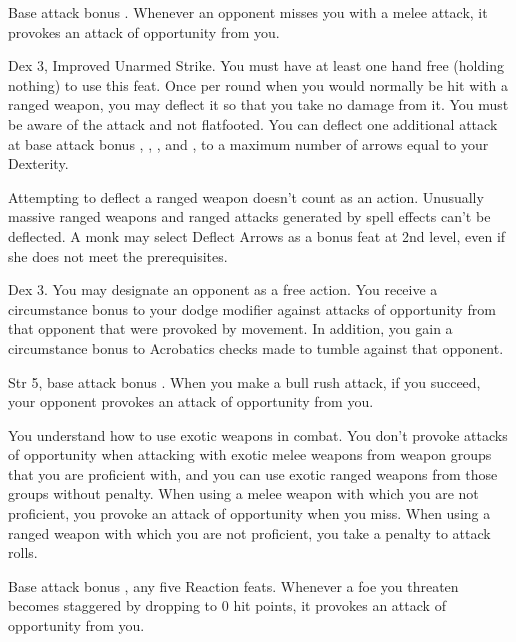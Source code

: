 \featpre Base attack bonus .
\featben Whenever an opponent misses you with a melee attack, it provokes an attack of opportunity from you.

 Dex 3, Improved Unarmed Strike.
 You must have at least one hand free (holding nothing) to use this feat. Once per round when you would normally be hit with a ranged weapon, you may deflect it so that you take no damage from it. You must be aware of the attack and not flatfooted. You can deflect one additional attack at base attack bonus , , , and , to a maximum number of arrows equal to your Dexterity.
\par Attempting to deflect a ranged weapon doesn't count as an action. Unusually massive ranged weapons and ranged attacks generated by spell effects can't be deflected.
 A monk may select Deflect Arrows as a bonus feat at 2nd level, even if she does not meet the prerequisites.

 Dex 3.
 You may designate an opponent as a free action. You receive a  circumstance bonus to your dodge modifier against attacks of opportunity from that opponent that were provoked by movement. In addition, you gain a  circumstance bonus to Acrobatics checks made to tumble against that opponent.

\featpre Str 5, base attack bonus .
\featben When you make a bull rush attack, if you succeed, your opponent provokes an attack of opportunity from you.

You understand how to use exotic weapons in combat.
 You don't provoke attacks of opportunity when attacking with exotic melee weapons from weapon groups that you are proficient with, and you can use exotic ranged weapons from those groups without penalty.
 When using a melee weapon with which you are not proficient, you provoke an attack of opportunity when you miss. When using a ranged weapon with which you are not proficient, you take a  penalty to attack rolls.

 Base attack bonus , any five Reaction feats.
 Whenever a foe you threaten becomes staggered by dropping to 0 hit points, it provokes an attack of opportunity from you.

